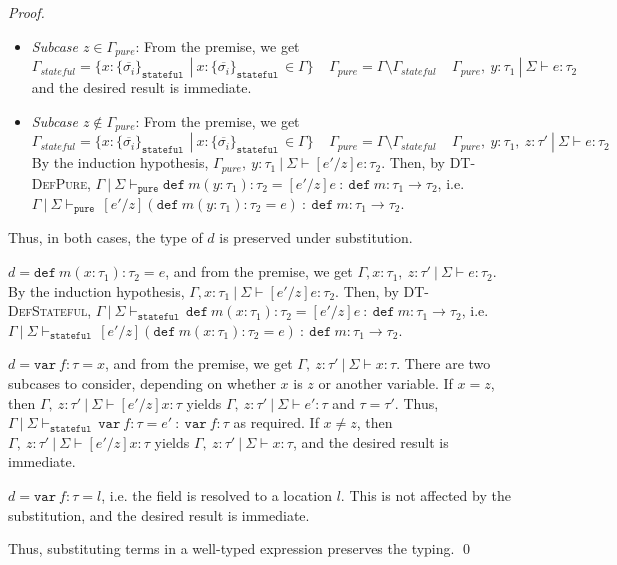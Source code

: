 \documentclass{llncs}
\newcommand{\keywadj}[1]{\mathtt{#1}}
\newcommand{\keyw}[1]{\keywadj{#1}~}
\newcommand{\pcase}[1][]{
  \if\relax\detokenize{#1}\relax
    \def\thiscase{}
  \else
    \def\thiscase{~#1}
  \fi
  \item
}
\begin{document}
\begin{proof}
\begin{pcases}
\begin{itemize}
\item[] \textit{Subcase $z \in \Gamma_{pure}$}: From the premise, we get
\[
\Gamma_{stateful} = \{x : \{ \overline{\sigma_i} \}_{\keyw{stateful}} ~|~ x : \{ \overline{\sigma_i} \}_{\keyw{stateful}} \in \Gamma\}~~~~~\Gamma_{pure} = \Gamma \setminus \Gamma_{stateful}~~~~~\Gamma_{pure},~y : \tau_1~|~\Sigma \vdash e : \tau_2
\]
and the desired result is immediate.

\item[] \textit{Subcase $z \not\in \Gamma_{pure}$}: From the premise, we get
\[
\Gamma_{stateful} = \{x : \{ \overline{\sigma_i} \}_{\keyw{stateful}} ~|~ x : \{ \overline{\sigma_i} \}_{\keyw{stateful}} \in \Gamma\}~~~~~\Gamma_{pure} = \Gamma \setminus \Gamma_{stateful}~~~~~\Gamma_{pure},~y : \tau_1,~z : \tau'~|~\Sigma \vdash e : \tau_2
\]
By the induction hypothesis, $\Gamma_{pure},~y : \tau_1~|~\Sigma \vdash [e'/z]e : \tau_2$. Then, by \textsc{DT-DefPure}, $\Gamma~|~\Sigma \vdash_{\keywadj{pure}} \keyw{def} m(y : \tau_1) : \tau_2 = [e'/z]e~:~\keyw{def} m : \tau_1 \rightarrow \tau_2$, i.e. $\Gamma~|~\Sigma \vdash_{\keyw{pure}} [e'/z](\keyw{def} m(y : \tau_1) : \tau_2 = e)~:~\keyw{def} m : \tau_1 \rightarrow \tau_2$.
\end{itemize}

Thus, in both cases, the type of $d$ is preserved under substitution.
\\
\pcase[\textsc{DT-DefStateful}]
$d = \keyw{def} m(x : \tau_1) : \tau_2 = e$, and from the premise, we get $\Gamma, x : \tau_1,~z : \tau'~|~\Sigma \vdash e : \tau_2$. By the induction hypothesis, $\Gamma, x : \tau_1~|~\Sigma \vdash [e'/z]e : \tau_2$. Then, by \textsc{DT-DefStateful}, $\Gamma~|~\Sigma \vdash_{\keyw{stateful}} \keyw{def} m(x : \tau_1) : \tau_2 = [e'/z]e~:~\keyw{def} m : \tau_1 \rightarrow \tau_2$, i.e. $\Gamma~|~\Sigma \vdash_{\keyw{stateful}} [e'/z](\keyw{def} m(x : \tau_1) : \tau_2 = e)~:~\keyw{def} m : \tau_1 \rightarrow \tau_2$.
\\
\pcase[\textsc{DT-Varx}]
$d = \keyw{var} f : \tau = x$, and from the premise, we get $\Gamma,~z : \tau'~|~\Sigma \vdash x : \tau$. There are two subcases to consider, depending on whether $x$ is $z$ or another variable. If $x = z$, then $\Gamma,~z : \tau'~|~\Sigma \vdash [e'/z]x : \tau$ yields $\Gamma,~z : \tau'~|~\Sigma \vdash e' : \tau$ and $\tau = \tau'$. Thus, $\Gamma~|~\Sigma \vdash_{\keyw{stateful}} \keyw{var} f : \tau = e'~:~\keyw{var} f : \tau$ as required. If $x \not = z$, then $\Gamma,~z : \tau'~|~\Sigma \vdash [e'/z]x : \tau$ yields $\Gamma,~z : \tau'~|~\Sigma \vdash x : \tau$, and the desired result is immediate.
\\
\pcase[\textsc{DT-Varl}]
$d = \keyw{var} f : \tau = l$, i.e. the field is resolved to a location $l$. This is not affected by the substitution, and the desired result is immediate.

\end{pcases}

\noindent Thus, substituting terms in a well-typed expression preserves the typing. \qed
\end{proof}
\end{document}

